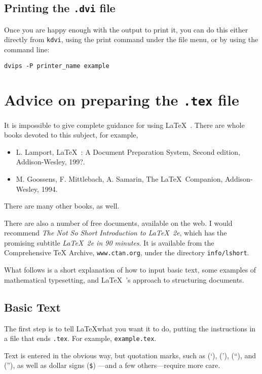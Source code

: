 \documentclass[12pt]{article}
\newcommand{\latex}{\LaTeX\ }
\begin{document}
\subsection{Printing the \texttt{.dvi} file}

Once you are happy enough with the output to print it, you can do
this either directly from \texttt{kdvi}, using the print command
under the file menu, or by using the command line:

\begin{verbatim}
dvips -P printer_name example
\end{verbatim}

\section{Advice on preparing the \texttt{.tex} file}

It is impossible to give complete guidance for using \latex.
There are whole books devoted to this subject, for example,
\begin{itemize}
\item L. Lamport, \latex : A Document Preparation System,
	Second edition, Addison-Wesley, 199?.
\item M. Goossens, F. Mittlebach, A. Samarin, The \latex Companion,
	Addison-Wesley, 1994.
\end{itemize}
There are many other books, as well.

There are also a number of free documents, available on the web.
I would recommend \textsl{The Not So Short Introduction to
\latex2e}, which has the promising subtitle \textsl{\latex2e
in 90 minutes}.
It is available from the Comprehensive TeX Archive,
\texttt{www.ctan.org}, under the directory \texttt{info/lshort}.

What follows is a short explanation of how to input basic
text, some examples of mathematical typesetting, and
\latex's approach to structuring documents.

\subsection{Basic Text}

The first step is to tell \LaTeX what you want it to do, putting
the instructions in a file that ends \texttt{.tex}.  For example,
\texttt{example.tex}.

Text is entered in the obvious way, but quotation marks, such
as (`), ('), (``), and (''), as well as dollar signs (\verb+$+) 
---and a few others---require more care.
\end{document}
